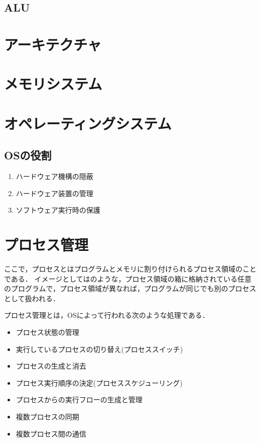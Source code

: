 \subsection{ALU}

\section{アーキテクチャ}

\section{メモリシステム}

\section{オペレーティングシステム}

\subsection{OSの役割}

\begin{enumerate}
    \item ハードウェア機構の隠蔽
    \item ハードウェア装置の管理
    \item ソフトウェア実行時の保護
\end{enumerate}

\section{プロセス管理}

ここで，プロセスとはプログラムとメモリに割り付けられるプロセス領域のことである．
イメージとしてはのような，プロセス領域の箱に格納されている任意のプログラムで，プロセス領域が異なれば，プログラムが同じでも別のプロセスとして扱われる．


プロセス管理とは，OSによって行われる次のような処理である．

\begin{itemize}
    \item プロセス状態の管理
    \item 実行しているプロセスの切り替え(プロセススイッチ) 
    \item プロセスの生成と消去
    \item プロセス実行順序の決定(プロセススケジューリング)
    \item プロセスからの実行フローの生成と管理
    \item 複数プロセスの同期
    \item 複数プロセス間の通信
\end{itemize}

